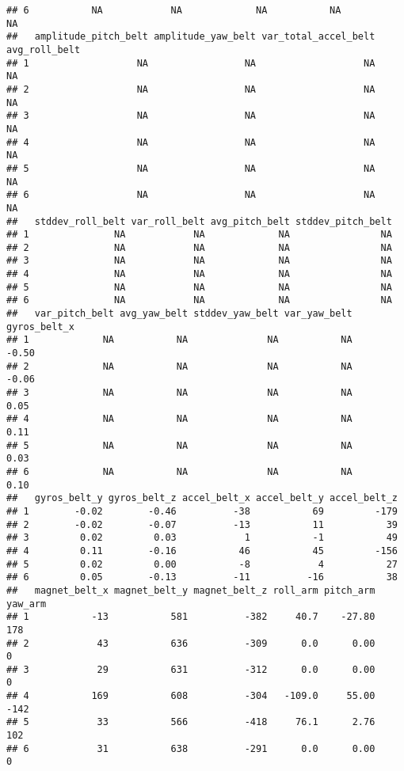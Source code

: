 \documentclass[]{article}
\begin{document}
\begin{verbatim}
## 6           NA            NA             NA           NA                  NA
##   amplitude_pitch_belt amplitude_yaw_belt var_total_accel_belt avg_roll_belt
## 1                   NA                 NA                   NA            NA
## 2                   NA                 NA                   NA            NA
## 3                   NA                 NA                   NA            NA
## 4                   NA                 NA                   NA            NA
## 5                   NA                 NA                   NA            NA
## 6                   NA                 NA                   NA            NA
##   stddev_roll_belt var_roll_belt avg_pitch_belt stddev_pitch_belt
## 1               NA            NA             NA                NA
## 2               NA            NA             NA                NA
## 3               NA            NA             NA                NA
## 4               NA            NA             NA                NA
## 5               NA            NA             NA                NA
## 6               NA            NA             NA                NA
##   var_pitch_belt avg_yaw_belt stddev_yaw_belt var_yaw_belt gyros_belt_x
## 1             NA           NA              NA           NA        -0.50
## 2             NA           NA              NA           NA        -0.06
## 3             NA           NA              NA           NA         0.05
## 4             NA           NA              NA           NA         0.11
## 5             NA           NA              NA           NA         0.03
## 6             NA           NA              NA           NA         0.10
##   gyros_belt_y gyros_belt_z accel_belt_x accel_belt_y accel_belt_z
## 1        -0.02        -0.46          -38           69         -179
## 2        -0.02        -0.07          -13           11           39
## 3         0.02         0.03            1           -1           49
## 4         0.11        -0.16           46           45         -156
## 5         0.02         0.00           -8            4           27
## 6         0.05        -0.13          -11          -16           38
##   magnet_belt_x magnet_belt_y magnet_belt_z roll_arm pitch_arm yaw_arm
## 1           -13           581          -382     40.7    -27.80     178
## 2            43           636          -309      0.0      0.00       0
## 3            29           631          -312      0.0      0.00       0
## 4           169           608          -304   -109.0     55.00    -142
## 5            33           566          -418     76.1      2.76     102
## 6            31           638          -291      0.0      0.00       0

\end{verbatim}
\end{document}
